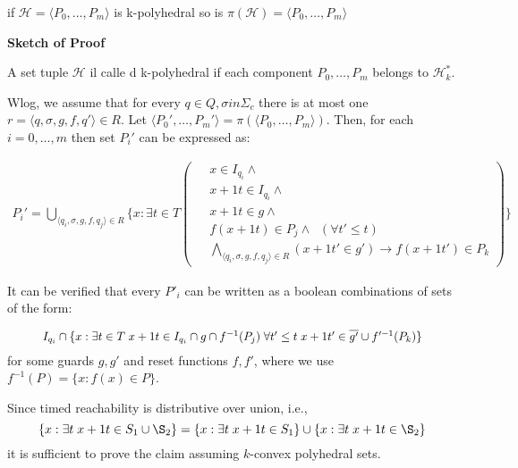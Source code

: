 \documentclass[table]{beamer}
\begin{document}
\begin{frame}
	\begin{thm}
		if $\mathcal{H} = \langle P_0, \ldots, P_m\rangle$ is k-polyhedral so is $\pi(\mathcal{H}) = \langle P_0, \ldots, P_m\rangle$
	\end{thm}
\end{frame}

\begin{frame}
	\textbf{Sketch of Proof}

	A set tuple $\mathcal{H}$ il calle d k-polyhedral if each component $P_0,\ldots,P_m$ belongs to $\mathcal{H}^*_k$.

	Wlog, we assume that for every $q \in Q,\sigma in \Sigma_c$ there is at most one $r=\langle q,\sigma,g,f,q'\rangle \in R$. Let $\langle P_0', \ldots, P_m'\rangle = \pi(\langle P_0, \ldots, P_m\rangle)$. Then, for each $i=0,\ldots,m$ then set $P_i'$ can be expressed as:

	\noindent 
	\begin{adjustbox}{max width=\textwidth}
	\parbox{\linewidth}{%
		\begin{align*}
			P_i' = \bigcup_{\langle q_i,\sigma,g,f,q_j\rangle \in R} \{x : \exists t \in T \left (
			\begin{aligned}
				\;&x \in I_{q_i} \land\\
				\;&x+1t \in I_{q_i} \land\\ 
				\;&x+1t \in g \land\\
				\;&f(x+1t) \in P_j \land \;\; (\forall t' \leq t)\\
				\;&\bigwedge_{\langle q_i,\sigma,g,f,q_j\rangle \in R}(x+1t' \in g')\rightarrow f(x+1t')\in P_k
			\end{aligned} \right ) \}
		\end{align*}
	}
	\end{adjustbox}
\end{frame}

\begin{frame}
	It can be verified that every $P'_i$ can be written as a boolean combinations of sets of the form:

	\begin{equation*}
		\resizebox{.9\hsize}{!}{
			$I_{q_i} \cap \{x : \exists t \in T \;  x+1t \in I_{q_i} \cap g \cap f^{-1}(P_j)\; \forall t' \leq t \; x+1t' \in \overline{g'} \cup f'^{-1}(P_k)\}$
		}
	\end{equation*}
	for some guards $g,g'$ and reset functions $f,f'$, where we use $f^{-1}(P)=\{x : f(x) \in P\}$.

	\medskip
	
	Since timed reachability is distributive over union, i.e.,
	$$\{x:\exists t\;x+1t \in S_1 \cup \S_2\} = \{x:\exists t\;x+1t \in S_1\} \cup \{x:\exists t\;x+1t \in \S_2\}$$
	it is sufficient to prove the claim assuming $k$-convex polyhedral sets.

\end{frame}
\end{document}
